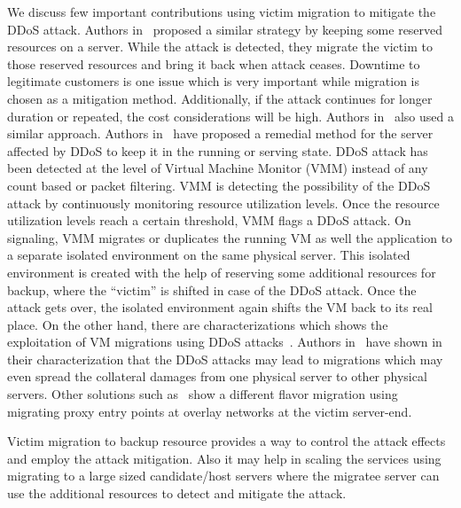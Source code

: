 \documentclass[final,5p,times,twocolumn]{elsarticle}
\begin{document}
We discuss few important contributions using victim migration to mitigate the DDoS attack. Authors in~\cite{defend} proposed a similar strategy by keeping some reserved resources on a server. While the attack is detected, they migrate the victim to those reserved resources and bring it back when attack ceases. Downtime to legitimate customers is one issue which is very important while migration is chosen as a mitigation method. Additionally, if the attack continues for longer duration or repeated, the cost considerations will be high. Authors in~\cite{latanicki} also used a similar approach. Authors in~\cite{defend} have proposed a remedial method for the server affected by DDoS to keep it in the running or serving state. DDoS attack has been detected at the level of Virtual Machine Monitor (VMM) instead of any count based or packet filtering. VMM is detecting the possibility of the DDoS attack by continuously monitoring resource utilization levels. Once the resource utilization levels reach a certain threshold, VMM flags a DDoS attack. On signaling, VMM migrates or duplicates the running VM as well the application to a separate isolated environment on the same physical server. This isolated environment is created with the help of reserving some additional resources for backup, where the ``victim'' is shifted in case of the DDoS attack. Once the attack gets over, the isolated environment again shifts the VM back to its real place. {On the other hand, there are characterizations which shows the exploitation of VM migrations using DDoS attacks~\cite{Wang2014}. Authors in~\cite{somani2016ddos} have shown in their characterization that the DDoS attacks may lead to migrations which may even spread the collateral damages from one physical server to other physical servers. Other solutions such as~\cite{MigrationFuji} show a different flavor migration using migrating proxy entry points at overlay networks at the victim server-end. }

{Victim migration to backup resource provides a way to control the attack effects and employ the attack mitigation. Also it may help in scaling the services using migrating to a large sized candidate/host servers where the migratee server can use the additional resources to detect and mitigate the attack.}
\end{document}
